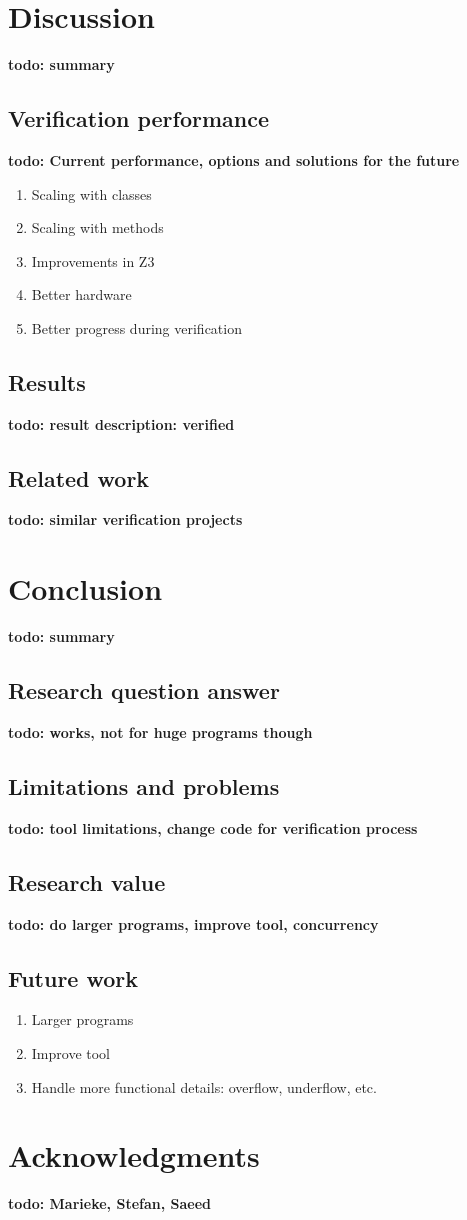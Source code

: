 \documentclass[a4paper]{article}
\newcommand{\todo}[1]{{\color{BurntOrange}\sffamily\textbf{todo: #1}\par}}
\begin{document}
\section{Discussion}
\todo{summary}

\subsection{Verification performance}
\todo{Current performance, options and solutions for the future}
\begin{enumerate}
	\item Scaling with classes
	\item Scaling with methods
	\item Improvements in Z3
	\item Better hardware
	\item Better progress during verification
\end{enumerate}

\subsection{Results}

\todo{result description: verified}

\subsection{Related work}
\todo{similar verification projects}


\section{Conclusion}
\todo{summary}

\subsection{Research question answer}
\todo{works, not for huge programs though}

\subsection{Limitations and problems}
\todo{tool limitations, change code for verification process}

\subsection{Research value}
\todo{do larger programs, improve tool, concurrency}

\subsection{Future work}
\begin{enumerate}
	\item Larger programs
	\item Improve tool
	\item Handle more functional details: overflow, underflow, etc.
\end{enumerate}

\section{Acknowledgments}
\todo{Marieke, Stefan, Saeed}




\end{document}
